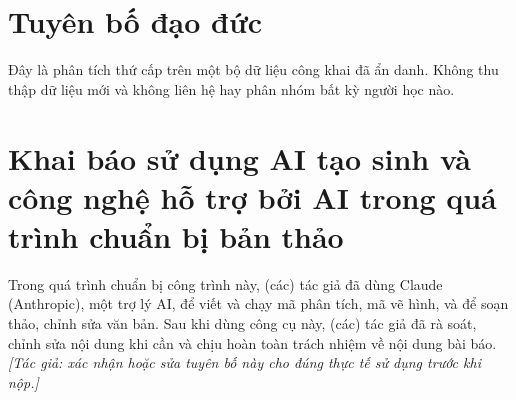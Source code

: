 \documentclass[a4paper,preprint,12pt,authoryear]{elsarticle}
\begin{document}
\section*{Tuyên bố đạo đức}
Đây là phân tích thứ cấp trên một bộ dữ liệu công khai đã ẩn danh. Không thu thập dữ liệu mới và không liên hệ hay phân nhóm bất kỳ người học nào.

\section*{Khai báo sử dụng AI tạo sinh và công nghệ hỗ trợ bởi AI trong quá trình chuẩn bị bản thảo}
Trong quá trình chuẩn bị công trình này, (các) tác giả đã dùng Claude (Anthropic), một trợ lý AI, để viết và chạy mã phân tích, mã vẽ hình, và để soạn thảo, chỉnh sửa văn bản. Sau khi dùng công cụ này, (các) tác giả đã rà soát, chỉnh sửa nội dung khi cần và chịu hoàn toàn trách nhiệm về nội dung bài báo. \emph{[Tác giả: xác nhận hoặc sửa tuyên bố này cho đúng thực tế sử dụng trước khi nộp.]}
\end{document}
